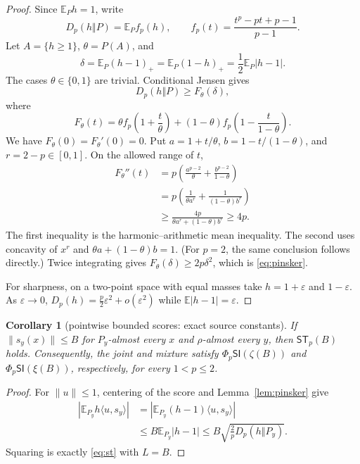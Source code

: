 \documentclass[11pt]{article}
\newtheorem{corollary}[theorem]{Corollary}
\theoremstyle{remark}
\newcommand{\E}{\mathbb E}
\newcommand{\norm}[1]{\lVert#1\rVert}
\newcommand{\ip}[2]{\langle#1,#2\rangle}
\newcommand{\ST}{\mathsf{ST}_p}
\begin{document}
\begin{proof}
Since $\E_Ph=1$, write
\[
 D_p(h\Vert P)=\E_P f_p(h),\qquad
 f_p(t)=\frac{t^p-pt+p-1}{p-1}.
\]
Let $A=\{h\geq1\}$, $\theta=P(A)$, and
\[
 \delta=\E_P(h-1)_+=\E_P(1-h)_+=\frac12\E_P|h-1|.
\]
The cases $\theta\in\{0,1\}$ are trivial.  Conditional Jensen gives
\[
 D_p(h\Vert P)\geq F_\theta(\delta),
\]
where
\[
 F_\theta(t)=\theta f_p\!\left(1+\frac t\theta\right)
 +(1-\theta)f_p\!\left(1-\frac t{1-\theta}\right).
\]
We have $F_\theta(0)=F_\theta'(0)=0$.  Put
$a=1+t/\theta$, $b=1-t/(1-\theta)$, and $r=2-p\in[0,1]$.  On the allowed
range of $t$,
\begin{align*}
 F_\theta''(t)
 &=p\left(\frac{a^{p-2}}\theta
 +\frac{b^{p-2}}{1-\theta}\right)\\
 &=p\left(\frac1{\theta a^r}
 +\frac1{(1-\theta)b^r}\right)\\
 &\geq \frac{4p}{\theta a^r+(1-\theta)b^r}
 \geq4p.
\end{align*}
The first inequality is the harmonic--arithmetic mean inequality.  The
second uses concavity of $x^r$ and
$\theta a+(1-\theta)b=1$.  (For $p=2$, the same conclusion follows directly.)
Twice integrating gives
$F_\theta(\delta)\geq2p\delta^2$, which is \eqref{eq:pinsker}.

For sharpness, on a two-point space with equal masses take
$h=1+\varepsilon$ and $1-\varepsilon$.  As $\varepsilon\to0$,
$D_p(h)=\frac p2\varepsilon^2+o(\varepsilon^2)$ while
$\E|h-1|=\varepsilon$.
\end{proof}

\begin{corollary}[pointwise bounded scores: exact source constants]
\label{cor:bounded}
If $\norm{s_y(x)}\leq B$ for $P_y$-almost every $x$ and $\rho$-almost every
$y$, then $\ST(B)$ holds.  Consequently, the joint and mixture satisfy
$\Phi_p\mathsf{SI}(\zeta(B))$ and
$\Phi_p\mathsf{SI}(\xi(B))$, respectively, for every $1<p\leq2$.
\end{corollary}

\begin{proof}
For $\norm u\leq1$, centering of the score and Lemma~\ref{lem:pinsker} give
\begin{align*}
 \left|\E_{P_y}h\ip{u}{s_y}\right|
 &=\left|\E_{P_y}(h-1)\ip{u}{s_y}\right|\\
 &\leq B\E_{P_y}|h-1|
 \leq B\sqrt{\frac2pD_p(h\Vert P_y)}.
\end{align*}
Squaring is exactly \eqref{eq:st} with $L=B$.
\end{proof}
\end{document}
